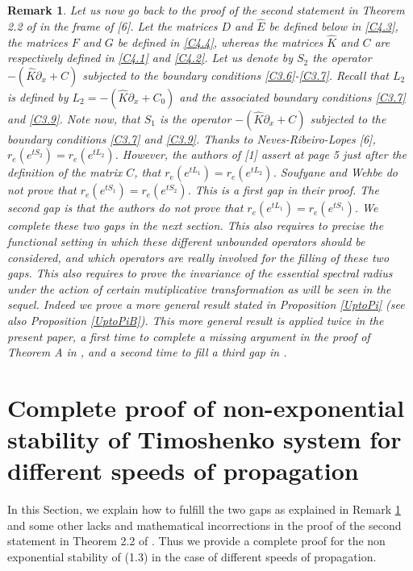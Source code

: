 \documentclass[10pt, english]{article}
\newtheorem{oss}[thm]{Remark}
\begin{document}
{\begin{oss}\label{Gaps}
Let us now go back to the proof of the second statement in Theorem 2.2 of \cite{SW2003} in the frame of [6].
Let the matrices $D$ and $\widehat{E}$ be defined below in \eqref{C4.3}, the matrices $F$ and $G$ be defined in \eqref{C4.4}, whereas the matrices $\widehat{K}$ and $C$ are respectively defined in  \eqref{C4.1} and  \eqref{C4.2}. 
 Let us denote by $S_2$ the operator $-(\hat{K}\partial_x +C)$ subjected to the boundary conditions \eqref{C3.6}-\eqref{C3.7}. Recall that  $L_2$ is defined by $L_2=-(\hat{K}\partial_x + C_0)$ and the associated boundary conditions \eqref{C3.7} and \eqref{C3.9}. Note now, that $S_1$ is the operator $-(\hat{K}\partial_x +C)$ subjected to the boundary conditions \eqref{C3.7} and \eqref{C3.9}. Thanks to Neves-Ribeiro-Lopes [6], $r_e(e^{tS_2})=r_e(e^{tL_2})$. However, the authors of [1] assert at page 5 just after the definition of the matrix $C$, that $r_e(e^{tL_1})=r_e(e^{tL_2})$.
 Soufyane and Wehbe do not prove that $r_e(e^{tS_1})=r_e(e^{tS_2})$. This is a first gap in their proof. The second gap is that the authors do not prove that $r_e(e^{tL_1})=r_e(e^{tS_1})$. We complete these two gaps in the next section. This also requires to precise the functional setting in which these different unbounded operators should be considered, and which operators are really involved for the filling of these two gaps. This also requires to prove the invariance of the essential spectral radius under the action of certain mutiplicative transformation as will be seen in the sequel. Indeed we prove a more general result stated in Proposition \ref{UptoPi} (see also Proposition \ref{UptoPiB}). This more general result is applied twice in the present paper, a first time to complete a missing argument in the proof of Theorem A in \cite{NRL1986}, and a second time to fill a third gap in \cite{SW2003}.
 \end{oss}

\section{Complete proof of non-exponential stability of Timoshenko system for different speeds of propagation}
In this Section, we explain how to fulfill the two gaps as explained in Remark \ref{Gaps} and  some other lacks and mathematical incorrections  in the proof of the second statement in Theorem 2.2 of \cite{SW2003}. Thus we provide a complete proof for the non exponential stability of (1.3) in the case of different speeds of propagation.

}
\end{document}
